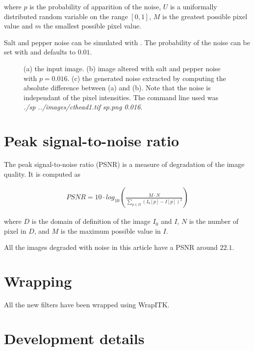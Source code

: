 \documentclass{InsightArticle}
\begin{document}
where $p$ is the probability of apparition of the noise, $U$ is a uniformally distributed
random variable on the range $[0, 1]$, $M$ is the greatest possible pixel value and $m$ the
smallest possible pixel value.

Salt and pepper noise can be simulated with . The probability
of the noise can be set with  and defaults to $0.01$.

\begin{figure}[htbp]
\begin{center}
\caption{(a) the input image. (b) image altered with salt and pepper noise with $p = 0.016$.
(c) the generated noise extracted by computing the absolute difference between (a)
and (b). Note that the noise is independant of the pixel intensities.
The command line used was {\em ./sp ../images/cthead1.tif sp.png 0.016}.}
\end{center}
\end{figure}

\section{Peak signal-to-noise ratio}

The peak signal-to-noise ratio (PSNR) is a measure of degradation of the image quality.
It is computed as

\begin{eqnarray}
PSNR = 10 \cdot log_{10}\left(\frac{M \cdot N}{\underset{p \in D}{\sum} (I_0[p]-I[p])^2}\right)
\end{eqnarray}

where $D$ is the domain of definition of the image $I_0$ and $I$, $N$ is the number of pixel in $D$,
and $M$ is the maximum possible value in $I$.

All the images degraded with noise in this article have a PSNR around $22.1$.

\section{Wrapping}

All the new filters have been wrapped using WrapITK.

\section{Development details}
\end{document}
